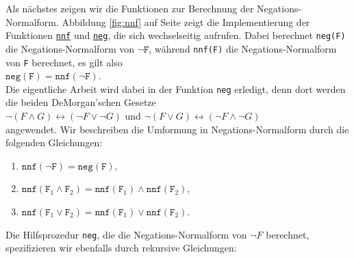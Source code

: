 Als nächstes zeigen wir die Funktionen zur Berechnung der Negations-Normalform.
Abbildung
\ref{fig:nnf} auf Seite \pageref{fig:nnf} zeigt die Implementierung der Funktionen
\href{https://github.com/karlstroetmann/Logik/blob/master/SetlX/knf.stlx}{\texttt{nnf}} und
\href{https://github.com/karlstroetmann/Logik/blob/master/SetlX/knf.stlx}{\texttt{neg}},
die sich wechselseitig aufrufen.  Dabei berechnet \texttt{neg(F)}
die Negations-Normalform von $\neg \texttt{F}$, während \texttt{nnf(F)} die
Negations-Normalform von \texttt{F} berechnet, es gilt also
\\[0.2cm]
\hspace*{1.3cm}
$\texttt{neg}(\texttt{F}) = \texttt{nnf}(\neg \texttt{F})$.
\\[0.2cm]
 Die eigentliche Arbeit wird dabei in der
Funktion \texttt{neg} erledigt, denn dort werden die beiden DeMorgan'schen Gesetze 
\\[0.2cm]
\hspace*{1.3cm}
$\neg (F \wedge G) \leftrightarrow (\neg F \vee \neg G)$ \quad und \quad 
$\neg (F \vee G) \leftrightarrow (\neg F \wedge \neg G)$ 
\\[0.2cm]
angewendet.  Wir beschreiben die Umformung in Negations-Normalform durch 
die folgenden Gleichungen:
\begin{enumerate}
\item $\texttt{nnf}(\neg \texttt{F}) = \texttt{neg}(\texttt{F})$,
\item $\texttt{nnf}(\texttt{F}_1 \wedge \texttt{F}_2) = \texttt{nnf}(\texttt{F}_1) \wedge \texttt{nnf}(\texttt{F}_2)$,
\item $\texttt{nnf}(\texttt{F}_1 \vee \texttt{F}_2) = \texttt{nnf}(\texttt{F}_1) \vee \texttt{nnf}(\texttt{F}_2)$.
\end{enumerate}
Die Hilfsprozedur \texttt{neg}, die die Negations-Normalform von $\neg F$ berechnet,
spezifizieren wir ebenfalls durch rekursive Gleichungen:
